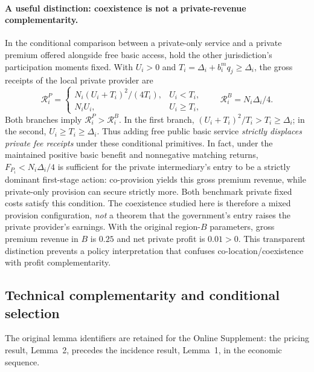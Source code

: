 \paragraph{A useful distinction: coexistence is not a private-revenue complementarity.}
In the conditional comparison between a private-only service and a private premium offered alongside free basic access, hold the other jurisdiction's participation moments fixed. With $U_i>0$ and $T_i=\Delta_i+b_i^m q_j\geq\Delta_i$, the gross receipts of the local private provider are
\begin{equation}
 \mathcal R_i^P=
 \begin{cases}
  N_i(U_i+T_i)^2/(4T_i),& U_i<T_i,\\
  N_iU_i,&U_i\geq T_i,
 \end{cases}
 \qquad
 \mathcal R_i^B=N_i\Delta_i/4.
 \label{eq:revenue-crowding}
\end{equation}
Both branches imply $\mathcal R_i^P>\mathcal R_i^B$. In the first branch, $(U_i+T_i)^2/T_i>T_i\geq\Delta_i$; in the second, $U_i\geq T_i\geq\Delta_i$. Thus adding free public basic service \emph{strictly displaces private fee receipts} under these conditional primitives. In fact, under the maintained positive basic benefit and nonnegative matching returns, $F_{P_i}<N_i\Delta_i/4$ is sufficient for the private intermediary's entry to be a strictly dominant first-stage action: co-provision yields this gross premium revenue, while private-only provision can secure strictly more. Both benchmark private fixed costs satisfy this condition. The coexistence studied here is therefore a mixed provision configuration, \emph{not} a theorem that the government's entry raises the private provider's earnings. With the original region-$B$ parameters, gross premium revenue in $B$ is $0.25$ and net private profit is $0.01>0$. This transparent distinction prevents a policy interpretation that confuses co-location/coexistence with profit complementarity.


\subsection{Technical complementarity and conditional selection}
The original lemma identifiers are retained for the Online Supplement: the pricing result, Lemma~2, precedes the incidence result, Lemma~1, in the economic sequence.
